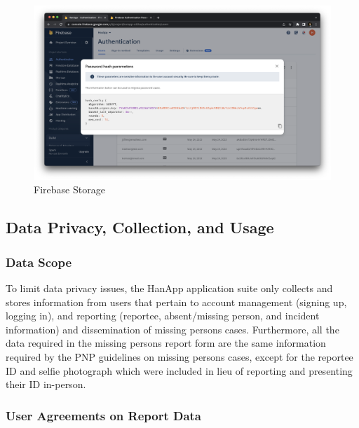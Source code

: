 \begin{figure}[!h]
    \centering
    \begin{minipage}[c]{1\linewidth}
        \centering
        \includegraphics[scale=0.25]{figures/Chapter4/Firebase/passwordHash.png}
        \caption{Firebase Storage}
        \label{fig:passwordHash}
    \end{minipage}
\end{figure}

\subsection{Data Privacy, Collection, and Usage}

\subsubsection{Data Scope}

To limit data privacy issues, the HanApp application suite only collects and stores information from users that pertain to account management (signing up, logging in), and reporting (reportee, absent/missing person, and incident information) and dissemination of missing persons cases. Furthermore, all the data required in the missing persons report form are the same information required by the PNP guidelines on missing persons cases, except for the reportee ID and selfie photograph which were included in lieu of  reporting and presenting their ID in-person.

\subsubsection{User Agreements on Report Data}

